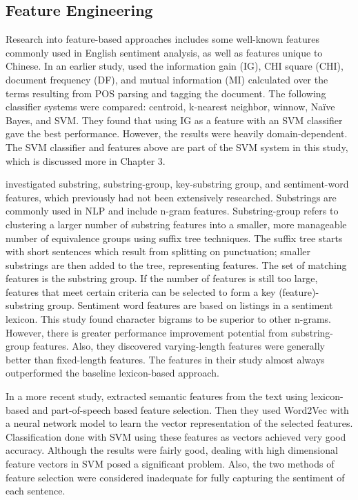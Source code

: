 \documentclass [11pt, proquest] {uwthesis}[2020/02/24]
\begin{document}
\subsection{Feature Engineering}
Research into feature-based approaches includes some well-known features commonly used in English sentiment analysis, as well as features unique to Chinese. In an earlier study, \cite{Tan2008} used the information gain (IG), CHI square (CHI), document frequency (DF), and mutual information (MI) calculated over the terms resulting from POS parsing and tagging the document. The following classifier systems were compared: centroid, k-nearest neighbor, winnow, Naïve Bayes, and  SVM. They found that using IG as a feature with an SVM classifier gave the best performance. However, the results were heavily domain-dependent. The SVM classifier and features above are part of the SVM system in this study, which is discussed more in Chapter 3.

\cite{Zhai2011} investigated substring, substring-group, key-substring group, and sentiment-word features, which previously had not been extensively researched. Substrings are commonly used in NLP and include n-gram features. Substring-group refers to clustering a larger number of substring features into a smaller, more manageable number of equivalence groups using suffix tree techniques. The suffix tree starts with short sentences which result from splitting on punctuation; smaller substrings are then added to the tree, representing features. The set of matching features is the substring group. If the number of features is still too large, features that meet certain criteria can be selected to form a key (feature)-substring group. Sentiment word features are based on listings in a sentiment lexicon. This study found character bigrams to be superior to other n-grams. However, there is greater performance improvement potential from substring-group features. Also, they discovered varying-length features were generally better than fixed-length features. The features in their study almost always outperformed the baseline lexicon-based approach. 

In a more recent study, \cite{Su2014} extracted semantic features from the text using lexicon-based and part-of-speech based feature selection. Then they used Word2Vec with a neural network model to learn the vector representation of the selected features. Classification done with SVM using these features as vectors achieved very good accuracy. Although the results were fairly good, dealing with high dimensional feature vectors in SVM posed a significant problem. Also, the two methods of feature selection were considered inadequate for fully capturing the sentiment of each sentence. 
\end{document}
